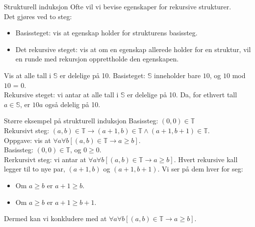 \begin{frame}{Strukturell induksjon}
    Ofte vil vi bevise egenskaper for rekursive strukturer.\\
    Det gjøres ved to steg:\\
    \begin{itemize}
        \item Basissteget: vis at egenskap holder for strukturens basissteg.
        \item Det rekursive steget: vis at om en egenskap allerede holder for en struktur, vil en runde med rekursjon opprettholde den egenskapen.
    \end{itemize}
    
    \pause
    \begin{block}{Vis at alle tall i $\mathbb{S}$ er delelige på 10.}
        Basisteget: $\mathbb{S}$ inneholder bare $10$, og $10$ mod $10$ = 0. \checkmark\\
        Rekursive steget: vi antar at alle tall i $\mathbb{S}$ er delelige på 10. Da, for ethvert tall $a \in \mathbb{S}$, er $10a$ også delelig på 10. \checkmark
    \end{block}
\end{frame}

\begin{frame}{Større eksempel på strukturell induksjon}
    Basissteg: $(0, 0) \in \mathbb{T}$\\
    Rekursivt steg: $(a, b) \in \mathbb{T} \rightarrow (a+1, b) \in \mathbb{T} \land (a+1, b+1) \in \mathbb{T}$.\\
    
    Oppgave: vis at $\forall a \forall b [(a, b) \in \mathbb{T} \rightarrow a \geq b]$.\\
    
    \pause
    Basissteg: $(0, 0) \in \mathbb{T}$, og $0 \geq 0$. \checkmark\\
    Rerkursivt steg: vi antar at $\forall a \forall b [(a, b) \in \mathbb{T} \rightarrow a \geq b]$. Hvert rekursive kall legger til to nye par, $(a+1, b)$ og $(a+1, b+1)$. Vi ser på dem hver for seg:
    \begin{itemize}
        \item Om $a \geq b$ er $a+1 \geq b$.
        \item Om $a \geq b$ er $a+1 \geq b+1$. \checkmark
    \end{itemize}
    Dermed kan vi konkludere med at $\forall a \forall b [(a, b) \in \mathbb{T} \rightarrow a \geq b]$.
\end{frame}


